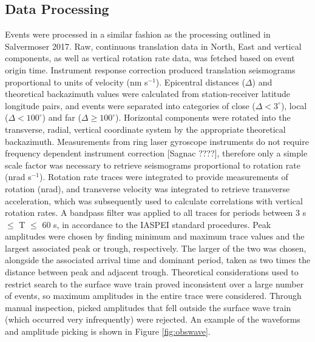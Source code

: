 \documentclass{gji}
\begin{document}
\subsection{Data Processing}\label{sec:dataproc}
Events were processed in a similar fashion as the processing outlined in Salvermoser 2017. %
Raw, continuous translation data in North, East and vertical components, as well as vertical rotation rate data, was fetched based on event origin time. Instrument response correction produced translation seismograms proportional to units of velocity (nm s$^{-1}$). Epicentral distances ($\Delta$) and theoretical backazimuth values were calculated from station-receiver latitude longitude pairs, and events were separated into categories of close ($\Delta < 3^\circ$), local ($\Delta <100^\circ$) and far ($\Delta \ge 100^\circ$). Horizontal components were rotated into the transverse, radial, vertical coordinate system by the appropriate theoretical backazimuth. Measurements from ring laser gyroscope instruments do not require frequency dependent instrument correction [Sagnac ????], %
therefore only a simple scale factor was necessary to retrieve seismograms proportional to rotation rate (nrad s$^{-1}$). Rotation rate traces were integrated to provide measurements of rotation (nrad), and transverse velocity was integrated to retrieve transverse acceleration, which was subsequently used to calculate correlations with vertical rotation rates.
A bandpass filter was applied to all traces for periods between 3 s $\le$ T $\le$ 60 s, in accordance to the IASPEI standard procedures. Peak amplitudes were chosen by finding minimum and maximum trace values and the largest associated peak or trough, respectively. The larger of the two was chosen, alongside the associated arrival time and dominant period, taken as two times the distance between peak and adjacent trough. 
Theoretical considerations used to restrict search to the surface wave train proved inconsistent over a large number of events, so maximum amplitudes in the entire trace were considered. Through manual inspection, picked amplitudes that fell outside the surface wave train (which occurred very infrequently) were rejected. An example of the waveforms and amplitude picking is shown in Figure \ref{fig:obswave}.
\end{document}
